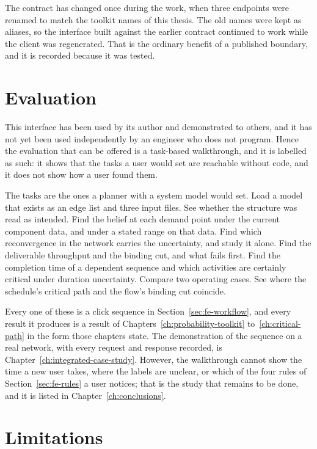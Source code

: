 \documentclass[12pt]{report}
\begin{document}
The contract has changed once during the work, when three endpoints were renamed to match
the toolkit names of this thesis. The old names were kept as aliases, so the interface built
against the earlier contract continued to work while the client was regenerated. That is
the ordinary benefit of a published boundary, and it is recorded because it was tested.

\section{Evaluation}
\label{sec:fe-evaluation}

This interface has been used by its author and demonstrated to others, and it has not yet
been used independently by an engineer who does not program. Hence the evaluation that can
be offered is a task-based walkthrough, and it is labelled as such: it shows that the tasks
a user would set are reachable without code, and it does not show how a user found them.

The tasks are the ones a planner with a system model would set. Load a model that exists as
an edge list and three input files. See whether the structure was read as intended. Find
the belief at each demand point under the current component data, and under a stated range
on that data. Find which reconvergence in the network carries the uncertainty, and study it
alone. Find the deliverable throughput and the binding cut, and what fails first. Find the
completion time of a dependent sequence and which activities are certainly critical under
duration uncertainty. Compare two operating cases. See where the schedule's critical path
and the flow's binding cut coincide.

Every one of these is a click sequence in Section~\ref{sec:fe-workflow}, and every result
it produces is a result of Chapters~\ref{ch:probability-toolkit}
to~\ref{ch:critical-path} in the form those chapters state. The demonstration of the
sequence on a real network, with every request and response recorded, is
Chapter~\ref{ch:integrated-case-study}. However, the walkthrough cannot show the time a new
user takes, where the labels are unclear, or which of the four rules of
Section~\ref{sec:fe-rules} a user notices; that is the study that remains to be done, and
it is listed in Chapter~\ref{ch:conclusions}.

\section{Limitations}
\label{sec:fe-limitations}
\end{document}
